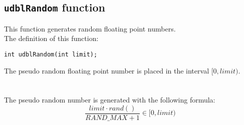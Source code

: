 \subsection{\texttt{udblRandom} function} \label{sec:udblRandom}

This function generates random floating point numbers.\\

The definition of this function:
%
\begin{verbatim}
int udblRandom(int limit);  
\end{verbatim}
%
The pseudo random floating point number is placed in the interval $[0,limit)$.\\ \\
%
%
\ \\
%
The pseudo random number is generated with the following formula:
%
\begin{displaymath}
\frac{limit \cdot rand()}{RAND\_MAX + 1} \in [0,limit)
\end{displaymath}
%
